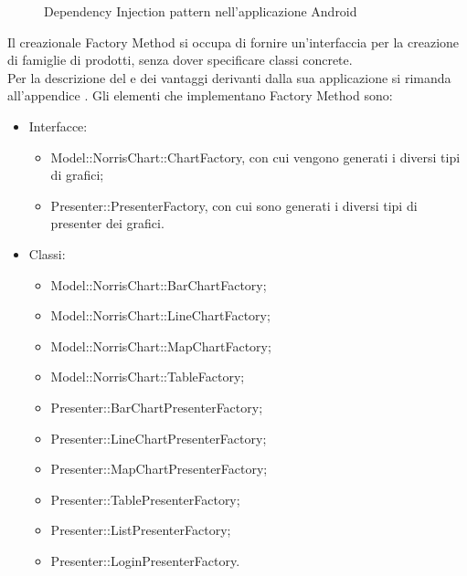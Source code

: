 \begin{itemize}
\begin{figure}[H]
	        		\caption{Dependency Injection pattern nell'applicazione Android}
	    		\end{figure}
                \end{itemize}
                
            Il  creazionale Factory Method si occupa di fornire un'interfaccia per la creazione di famiglie di prodotti, senza dover specificare classi concrete. \\
            Per la descrizione del  e dei vantaggi derivanti dalla sua applicazione si rimanda all'appendice .
                Gli elementi che implementano Factory Method sono:
                \begin{itemize}
                \item Interfacce:
                    \begin{itemize}
                        \item Model::NorrisChart::ChartFactory, con cui vengono generati i diversi tipi di grafici;
                        \item Presenter::PresenterFactory, con cui sono generati i diversi tipi di presenter dei grafici.
                    \end{itemize}
                \item Classi:
                    \begin{itemize}
                        \item Model::NorrisChart::BarChartFactory;
                        \item Model::NorrisChart::LineChartFactory;
                        \item Model::NorrisChart::MapChartFactory;
                        \item Model::NorrisChart::TableFactory;
                        \item Presenter::BarChartPresenterFactory;
                        \item Presenter::LineChartPresenterFactory;
                        \item Presenter::MapChartPresenterFactory;
                        \item Presenter::TablePresenterFactory;
                        \item Presenter::ListPresenterFactory;
                        \item Presenter::LoginPresenterFactory.
                    \end{itemize}
                \end{itemize}
